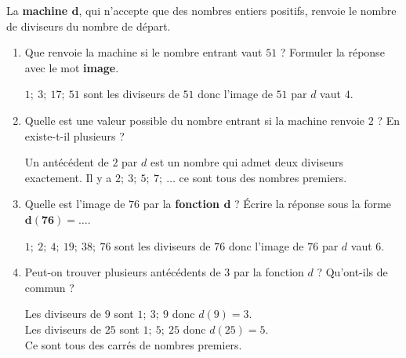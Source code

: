 \begin{corrige}
    La \textbf{machine $\boldsymbol{d}$}, qui n'accepte que des nombres entiers positifs, renvoie le nombre de diviseurs du nombre de départ.

    \hspace*{-13mm}
    \begin{enumerate}
        \item Que renvoie la machine si le nombre entrant vaut $51$ ? Formuler la réponse avec le mot \textbf{image}.
        
        {\red $1;~3;~17;~51$ sont les diviseurs de $51$ donc l'image de $51$ par $d$ vaut $4$.}
        \item Quelle est une valeur possible du nombre entrant si la machine renvoie  $2$ ? En existe-t-il plusieurs ?
        
        {\red Un antécédent de $2$ par $d$ est un nombre qui admet deux diviseurs exactement. Il y a $2;~3;~5;~7;~\dots$ ce sont tous des nombres premiers.}
        \item Quelle est l'image de $76$ par la \textbf{fonction $\boldsymbol{d}$} ? Écrire la réponse sous la forme $\boldsymbol{d(76)=\ldots}$.
        
        {\red $1;~2;~4;~19;~38;~76$ sont les diviseurs de $76$ donc l'image de $76$ par $d$ vaut $6$.}
        \item Peut-on trouver plusieurs antécédents de 3 par la fonction $d$ ? Qu'ont-ils de commun ?
        
        {\red 
        Les diviseurs de $9$ sont $1;~3;~9$ donc $d(9) = 3$.\\
        Les diviseurs de $25$ sont $1;~5;~25$ donc $d(25) = 5$.\\
        Ce sont tous des carrés de nombres premiers.       
        }
    \end{enumerate}
\end{corrige}
